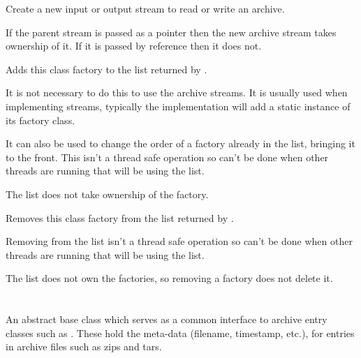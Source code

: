 

Create a new input or output stream to read or write an archive.

If the parent stream is passed as a pointer then the new archive stream
takes ownership of it. If it is passed by reference then it does not.


\label{wxarchiveclassfactorypushfront}


Adds this class factory to the list returned
by .

It is not necessary to do this to use the archive streams. It is usually
used when implementing streams, typically the implementation will 
add a static instance of its factory class.

It can also be used to change the order of a factory already in the list,
bringing it to the front. This isn't a thread safe operation
so can't be done when other threads are running that will be using the list.

The list does not take ownership of the factory.


\label{wxarchiveclassfactoryremove}


Removes this class factory from the list returned
by .

Removing from the list isn't a thread safe operation
so can't be done when other threads are running that will be using the list.

The list does not own the factories, so removing a factory does not delete it.


%
%

\section{}\label{wxarchiveentry}

An abstract base class which serves as a common interface to
archive entry classes such as .
These hold the meta-data (filename, timestamp, etc.), for entries
in archive files such as zips and tars.


